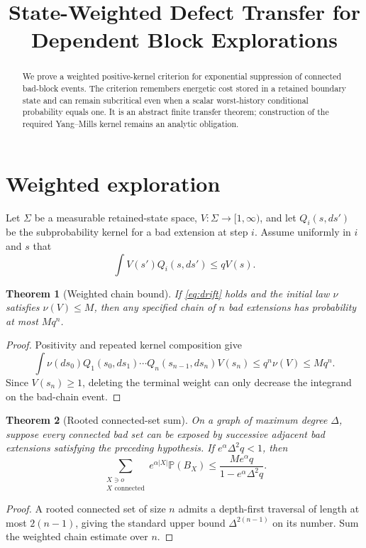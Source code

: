 \documentclass[11pt]{article}
\title{State-Weighted Defect Transfer for Dependent Block Explorations}
\author{}
\date{}
\newtheorem{theorem}{Theorem}
\begin{document}
\maketitle

\begin{abstract}
We prove a weighted positive-kernel criterion for exponential suppression of
connected bad-block events.  The criterion remembers energetic cost stored in
a retained boundary state and can remain subcritical even when a scalar
worst-history conditional probability equals one.  It is an abstract finite
transfer theorem; construction of the required Yang--Mills kernel remains an
analytic obligation.
\end{abstract}

\section{Weighted exploration}
Let $\Sigma$ be a measurable retained-state space, $V:\Sigma\to[1,\infty)$,
and let $Q_i(s,ds')$ be the subprobability kernel for a bad extension at step
$i$.  Assume uniformly in $i$ and $s$ that
\begin{equation}\label{eq:drift}
 \int V(s')Q_i(s,ds')\le qV(s).
\end{equation}

\begin{theorem}[Weighted chain bound]
If \eqref{eq:drift} holds and the initial law $\nu$ satisfies
$\nu(V)\le M$, then any specified chain of $n$ bad extensions has probability
at most $Mq^n$.
\end{theorem}
\begin{proof}
Positivity and repeated kernel composition give
\[
 \int \nu(ds_0)Q_1(s_0,ds_1)\cdots Q_n(s_{n-1},ds_n)V(s_n)
 \le q^n\nu(V)\le Mq^n.
\]
Since $V(s_n)\ge1$, deleting the terminal weight can only decrease the
integrand on the bad-chain event.
\end{proof}

\begin{theorem}[Rooted connected-set sum]
On a graph of maximum degree $\Delta$, suppose every connected bad set can be
exposed by successive adjacent bad extensions satisfying the preceding
hypothesis.  If $e^\alpha\Delta^2q<1$, then
\[
 \sum_{\substack{X\ni o\\X\text{ connected}}}
 e^{\alpha|X|}\mathbb P(B_X)
 \le \frac{M e^\alpha q}{1-e^\alpha\Delta^2q}.
\]
\end{theorem}
\begin{proof}
A rooted connected set of size $n$ admits a depth-first traversal of length at
most $2(n-1)$, giving the standard upper bound
$\Delta^{2(n-1)}$ on its number.  Sum the weighted chain estimate over $n$.
\end{proof}
\end{document}
